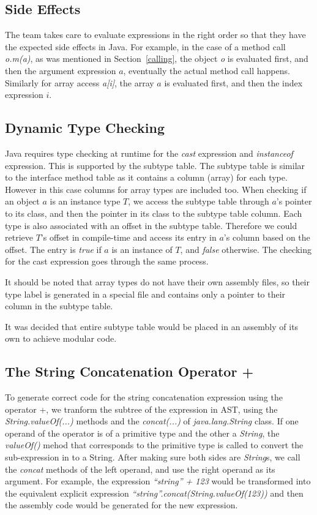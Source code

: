 \documentclass[a4paper, notitlepage]{report}
\begin{document}
\subsection{Side Effects}

The team takes care to evaluate expressions in the right order so that they have the expected side effects in Java. For example, in the case of a method call \emph{o.m(a)}, as was mentioned in Section~\ref{calling}, the object \emph{o} is evaluated first, and then the argument expression $a$, eventually the actual method call happens. Similarly for array access \emph{a[i]}, the array $a$ is evaluated first, and then the index expression $i$.

\subsection{Dynamic Type Checking}
\label{type_check}

Java requires type checking at runtime for the \emph{cast} expression and \emph{instanceof} expression. This is supported by the subtype table. The subtype table is similar to the interface method table as it contains a column (array) for each type. However in this case columns for array types are included too. When checking if an object $a$ is an instance type $T$, we access the subtype table through $a$'s pointer to its class, and then the pointer in its class to the subtype table column. Each type is also associated with an offset in the subtype table. Therefore we could retrieve $T$'s offset in compile-time and access its entry in $a$'s column based on the offset. The entry is \emph{true} if $a$ is an instance of $T$, and \emph{false} otherwise. The checking for the cast expression goes through the same process.

It should be noted that array types do not have their own assembly files, so their type label is generated in a special file and contains only a pointer to their column in the subtype table.

It was decided that entire subtype table would be placed in an assembly of its own to achieve modular code.

\subsection{The String Concatenation Operator +}

To generate correct code for the string concatenation expression using the operator +, we tranform the subtree of the expression in AST, using the \emph{String.valueOf(...)} methods and the \emph{concat(...)} of \emph{java.lang.String} class. If one operand of the operator is of a primitive type and the other a \emph{String}, the \emph{valueOf()} mehod that corresponds to the primitive type is called to convert the sub-expression in to a String. After making sure both sides are \emph{String}s, we call the \emph{concat} methods of the left operand, and use the right operand as its argument. For example, the expression \emph{``string'' + 123} would be transformed into the equivalent explicit expression \emph{``string''.concat(String.valueOf(123))} and then the assembly code would be generated for the new expression. 
\end{document}

